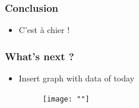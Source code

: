 \documentclass{beamer}
\begin{document}
\begin{frame}
\frametitle{Conclusion}
\begin{itemize}
    \item C'est à chier !
\end{itemize}
\end{frame}

\begin{frame}
    \frametitle{What's next ?}
    \begin{itemize}
        \item Insert graph with data of today
        \begin{figure}[h]
        \texttt{[image: ""]}
        \end{figure}
    \end{itemize}
\end{frame}
\end{document}
